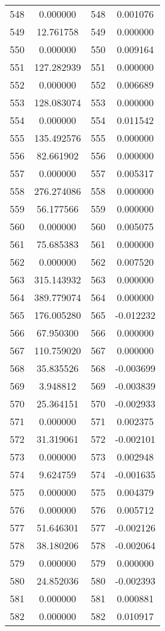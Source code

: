 \documentclass[12pt]{article}
\begin{document}
\begin{longtable}{@{}cccc@{}}
548 & 0.000000 & 548 & 0.001076 \\
549 & 12.761758 & 549 & 0.000000 \\
550 & 0.000000 & 550 & 0.009164 \\
551 & 127.282939 & 551 & 0.000000 \\
552 & 0.000000 & 552 & 0.006689 \\
553 & 128.083074 & 553 & 0.000000 \\
554 & 0.000000 & 554 & 0.011542 \\
555 & 135.492576 & 555 & 0.000000 \\
556 & 82.661902 & 556 & 0.000000 \\
557 & 0.000000 & 557 & 0.005317 \\
558 & 276.274086 & 558 & 0.000000 \\
559 & 56.177566 & 559 & 0.000000 \\
560 & 0.000000 & 560 & 0.005075 \\
561 & 75.685383 & 561 & 0.000000 \\
562 & 0.000000 & 562 & 0.007520 \\
563 & 315.143932 & 563 & 0.000000 \\
564 & 389.779074 & 564 & 0.000000 \\
565 & 176.005280 & 565 & -0.012232 \\
566 & 67.950300 & 566 & 0.000000 \\
567 & 110.759020 & 567 & 0.000000 \\
568 & 35.835526 & 568 & -0.003699 \\
569 & 3.948812 & 569 & -0.003839 \\
570 & 25.364151 & 570 & -0.002933 \\
571 & 0.000000 & 571 & 0.002375 \\
572 & 31.319061 & 572 & -0.002101 \\
573 & 0.000000 & 573 & 0.002948 \\
574 & 9.624759 & 574 & -0.001635 \\
575 & 0.000000 & 575 & 0.004379 \\
576 & 0.000000 & 576 & 0.005712 \\
577 & 51.646301 & 577 & -0.002126 \\
578 & 38.180206 & 578 & -0.002064 \\
579 & 0.000000 & 579 & 0.000000 \\
580 & 24.852036 & 580 & -0.002393 \\
581 & 0.000000 & 581 & 0.000881 \\
582 & 0.000000 & 582 & 0.010917 \\

\end{longtable}
\end{document}
